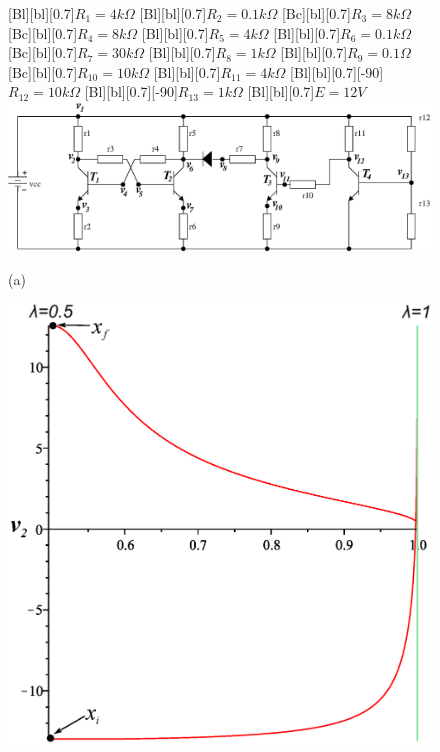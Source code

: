 \documentclass{elex}
\begin{document}
{\begin{figure}[tbp]
\centering
\begin{minipage}{\linewidth}
[Bl][bl][0.7]{$R_1=4k\Omega$}
[Bl][bl][0.7]{$R_2=0.1k\Omega$}
[Bc][bl][0.7]{$R_3=8k\Omega$}
[Bc][bl][0.7]{$R_4=8k\Omega$}
[Bl][bl][0.7]{$R_5=4k\Omega$}
[Bl][bl][0.7]{$R_6=0.1k\Omega$}
[Bc][bl][0.7]{$R_7=30k\Omega$}
[Bl][bl][0.7]{$R_8=1k\Omega$}
[Bl][bl][0.7]{$R_9=0.1\Omega$}
[Bc][bl][0.7]{$R_{10}=10k\Omega$}
[Bl][bl][0.7]{$R_{11}=4k\Omega$}
[Bl][bl][0.7][-90]{$R_{12}=10k\Omega$}
[Bl][bl][0.7][-90]{$R_{13}=1k\Omega$}
[Bl][bl][0.7]{$E=12V$}
\centering
\includegraphics[scale=0.55]{yamamura/diotran.eps}
\end{minipage}
\newline
\begin{minipage}[l]{0.5\linewidth}
\centering
\begin{small}
\center (a)
\end{small}
\end{minipage}
\newline
\begin{minipage}[l]{0.5\linewidth}
	\centering
	\includegraphics[scale=0.4]{yamamura/y1a.eps}

\end{minipage}
\end{figure}}
\end{document}
